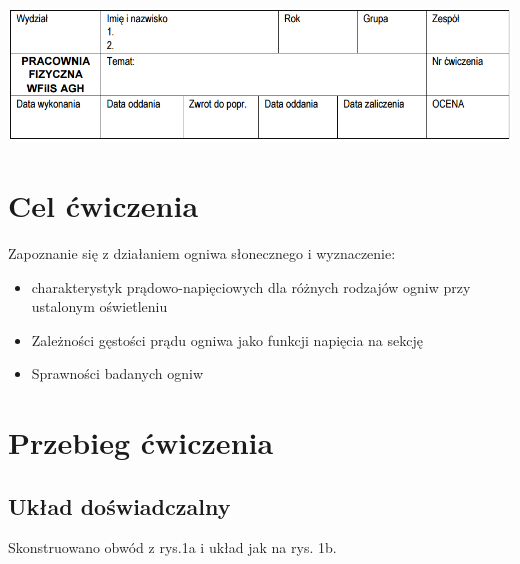 \documentclass[12pt,a4paper]{article}
\begin{document}
\includegraphics[scale=0.6]{img_fiz/header_table}

\section{Cel ćwiczenia}

Zapoznanie się z działaniem ogniwa słonecznego i wyznaczenie:

\begin{itemize}
\item charakterystyk prądowo-napięciowych dla różnych rodzajów ogniw
przy ustalonym oświetleniu
\item Zależności gęstości prądu ogniwa jako funkcji napięcia na sekcję
\item Sprawności badanych ogniw
\end{itemize}



\section{Przebieg ćwiczenia}

\subsection{Układ doświadczalny}
Skonstruowano obwód z rys.1a i układ jak na rys. 1b.
\end{document}
